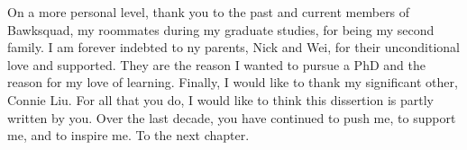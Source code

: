 On a more personal level, thank you to the past and current members of Bawksquad, my roommates during my graduate studies, for being my second family. I am forever indebted to ny parents, Nick and Wei, for their unconditional love and supported. They are the reason I wanted to pursue a PhD and the reason for my love of learning.
Finally, I would like to thank my significant other, Connie Liu. For all that you do, I would like to think this dissertion is partly written by you. Over the last decade, you have continued to push me, to support me, and to inspire me. To the next chapter.


